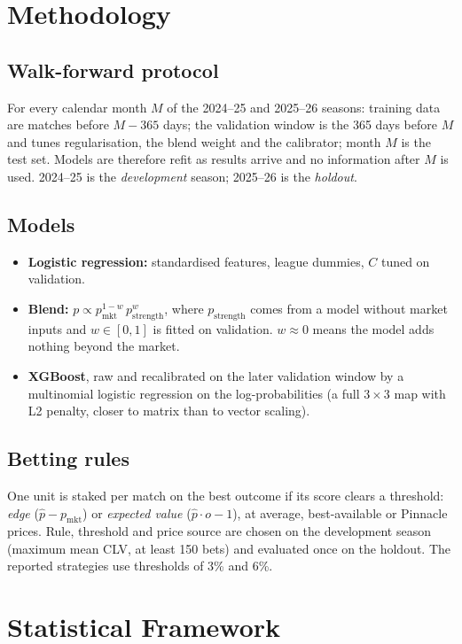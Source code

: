 \documentclass[11pt,a4paper]{article}
\begin{document}
\section{Methodology}
\subsection{Walk-forward protocol}
For every calendar month $M$ of the 2024--25 and 2025--26 seasons: training data are matches before $M-365$ days; the validation window is the 365 days before $M$ and tunes regularisation, the blend weight and the calibrator; month $M$ is the test set. Models are therefore refit as results arrive and no information after $M$ is used. 2024--25 is the \emph{development} season; 2025--26 is the \emph{holdout}.

\subsection{Models}
\begin{itemize}[noitemsep]
  \item \textbf{Logistic regression:} standardised features, league dummies, $C$ tuned on validation.
  \item \textbf{Blend:} $p\propto p_{\text{mkt}}^{1-w}\,p_{\text{strength}}^{w}$, where $p_{\text{strength}}$ comes from a model without market inputs and $w\in[0,1]$ is fitted on validation. $w\approx0$ means the model adds nothing beyond the market.
  \item \textbf{XGBoost}, raw and recalibrated on the later validation window by a multinomial logistic regression on the log-probabilities (a full $3\times3$ map with L2 penalty, closer to matrix than to vector scaling).
\end{itemize}

\subsection{Betting rules}
One unit is staked per match on the best outcome if its score clears a threshold: \emph{edge} ($\hat p-p_{\text{mkt}}$) or \emph{expected value} ($\hat p\cdot o-1$), at average, best-available or Pinnacle prices. Rule, threshold and price source are chosen on the development season (maximum mean CLV, at least 150 bets) and evaluated once on the holdout. The reported strategies use thresholds of 3\% and 6\%.

\section{Statistical Framework}
\end{document}
